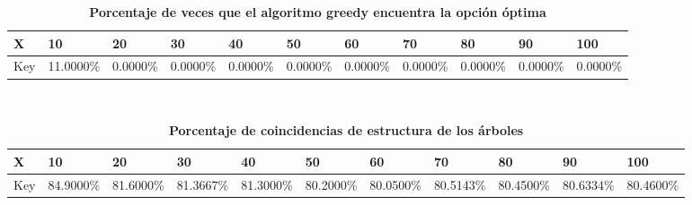\documentclass[10pt,letterpaper]{article}
\begin{document}
\newpage 
{}
\begin{center}
\begin{table}\renewcommand{\arraystretch}{2.5}
\caption{\large \textbf{Porcentaje de veces que el algoritmo greedy encuentra la opción óptima}}
\centering
\begin{tabular} { |m{0.5cm}|m{1.3cm}|m{1.3cm}|m{1.3cm}|m{1.3cm}|m{1.3cm}|m{1.3cm}|m{1.3cm}|m{1.3cm}|m{1.3cm}|m{1.3cm}|} 
\hline
\rowcolor{Gray}
\centering \textbf{X} & \centering \textbf{10} & \centering \textbf{20} & \centering \textbf{30}\ & \centering \textbf{40} & \centering \textbf{50} & \centering \textbf{60}\ & \centering \textbf{70} & \centering \textbf{80} & \centering \textbf{90}\ & \textbf{100} \\\hline
Key & 11.0000\% & 0.0000\% & 0.0000\% & 0.0000\% & 0.0000\% & 0.0000\% & 0.0000\% & 0.0000\% & 0.0000\% & 0.0000\% \\
\hline
\end{tabular} \\
\end{table}
\end{center}
\begin{center}
\begin{table}\renewcommand{\arraystretch}{2.5}
\caption{\large \textbf{Porcentaje de coincidencias de estructura de los árboles}}
\centering
\begin{tabular} { |m{0.5cm}|m{1.3cm}|m{1.3cm}|m{1.3cm}|m{1.3cm}|m{1.3cm}|m{1.3cm}|m{1.3cm}|m{1.3cm}|m{1.3cm}|m{1.3cm}|} 
\hline
\rowcolor{Gray}
\centering \textbf{X} & \centering \textbf{10} & \centering \textbf{20} & \centering \textbf{30}\ & \centering \textbf{40} & \centering \textbf{50} & \centering \textbf{60}\ & \centering \textbf{70} & \centering \textbf{80} & \centering \textbf{90}\ & \textbf{100} \\\hline
Key & 84.9000\% & 81.6000\% & 81.3667\% & 81.3000\% & 80.2000\% & 80.0500\% & 80.5143\% & 80.4500\% & 80.6334\% & 80.4600\% \\
\hline
\end{tabular} \\
\end{table}
\end{center}
\end{document}

